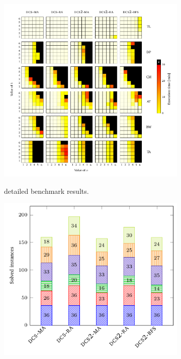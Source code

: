 \begin{figure}[th]
    \centering
    \hspace*{-20mm}
    \begin{subfigure}{0.7\textwidth}
        \includegraphics[width=\linewidth]{figures/benchmark/dcs_vs.pdf}\label{fig:dcs:results:detailed}
        \caption{\DCS detailed benchmark results.}
    \end{subfigure}%
    \begin{subfigure}{0.5\textwidth}
        \includegraphics[width=0.9\linewidth]{figures/benchmark/dcs_instances.pdf}\label{fig:dcs:results:instances}

\end{subfigure}
\end{figure}
